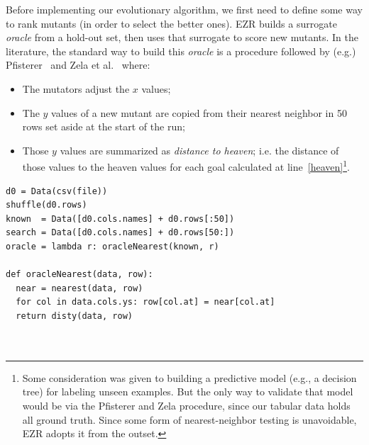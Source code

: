 \documentclass[AMA,STIX2COL]{WileyNJDv5}
\begin{document}
{Before implementing our evolutionary algorithm, we first need to
define some way to rank mutants (in order to select the better
ones). EZR builds a surrogate {\em oracle} from a hold-out set,
then uses that surrogate to score new mutants. In the literature,
the standard way to build this {\em oracle} is a procedure followed
by (e.g.) Pfisterer~\cite{pfisterer2022yahpo} and Zela et
al.~\cite{zela2020surrogate} where:
\begin{itemize}
\item The mutators adjust the $x$ values;
\item The $y$ values of a new mutant are copied from their nearest
neighbor in 50 rows set aside at the start of the run;
\item Those $y$ values are summarized as {\em distance to heaven};
i.e. the distance of those values to the \textsf{heaven} values
for each goal calculated at line~\ref{heaven}\footnote{Some
consideration was given to building a predictive model (e.g., a
decision tree) for labeling   unseen examples. But the
only way to validate that  model would be via the Pfisterer
and Zela procedure, since our tabular data holds all   ground
truth. Since some form of nearest-neighbor testing is unavoidable,
EZR adopts it from the outset.}.
\end{itemize}
\begin{verbatim}
d0 = Data(csv(file))   
shuffle(d0.rows)
known  = Data([d0.cols.names] + d0.rows[:50])
search = Data([d0.cols.names] + d0.rows[50:])
oracle = lambda r: oracleNearest(known, r)

def oracleNearest(data, row): 
  near = nearest(data, row)
  for col in data.cols.ys: row[col.at] = near[col.at]
  return disty(data, row)
  


\end{verbatim}}
\end{document}

